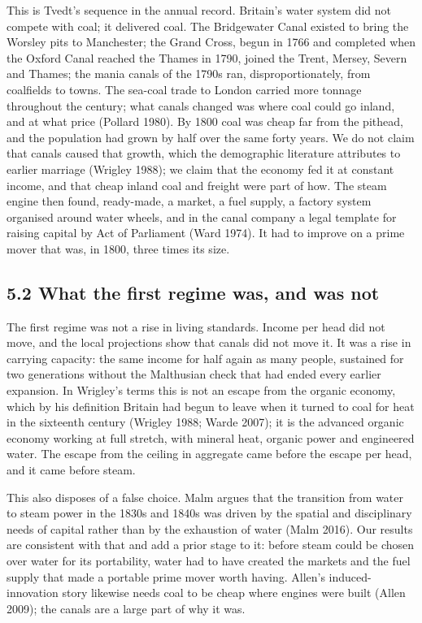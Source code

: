 \documentclass[
  11pt,
]{article}
\begin{document}
This is Tvedt's sequence in the annual record. Britain's water system
did not compete with coal; it delivered coal. The Bridgewater Canal
existed to bring the Worsley pits to Manchester; the Grand Cross, begun
in 1766 and completed when the Oxford Canal reached the Thames in 1790,
joined the Trent, Mersey, Severn and Thames; the mania canals of the
1790s ran, disproportionately, from coalfields to towns. The sea-coal
trade to London carried more tonnage throughout the century; what canals
changed was where coal could go inland, and at what price (Pollard
1980). By 1800 coal was cheap far from the pithead, and the population
had grown by half over the same forty years. We do not claim that canals
caused that growth, which the demographic literature attributes to
earlier marriage (Wrigley 1988); we claim that the economy fed it at
constant income, and that cheap inland coal and freight were part of
how. The steam engine then found, ready-made, a market, a fuel supply, a
factory system organised around water wheels, and in the canal company a
legal template for raising capital by Act of Parliament (Ward 1974). It
had to improve on a prime mover that was, in 1800, three times its size.

\subsection{5.2 What the first regime was, and was
not}\label{what-the-first-regime-was-and-was-not}

The first regime was not a rise in living standards. Income per head did
not move, and the local projections show that canals did not move it. It
was a rise in carrying capacity: the same income for half again as many
people, sustained for two generations without the Malthusian check that
had ended every earlier expansion. In Wrigley's terms this is not an
escape from the organic economy, which by his definition Britain had
begun to leave when it turned to coal for heat in the sixteenth century
(Wrigley 1988; Warde 2007); it is the advanced organic economy working
at full stretch, with mineral heat, organic power and engineered water.
The escape from the ceiling in aggregate came before the escape per
head, and it came before steam.

This also disposes of a false choice. Malm argues that the transition
from water to steam power in the 1830s and 1840s was driven by the
spatial and disciplinary needs of capital rather than by the exhaustion
of water (Malm 2016). Our results are consistent with that and add a
prior stage to it: before steam could be chosen over water for its
portability, water had to have created the markets and the fuel supply
that made a portable prime mover worth having. Allen's
induced-innovation story likewise needs coal to be cheap where engines
were built (Allen 2009); the canals are a large part of why it was.
\end{document}
